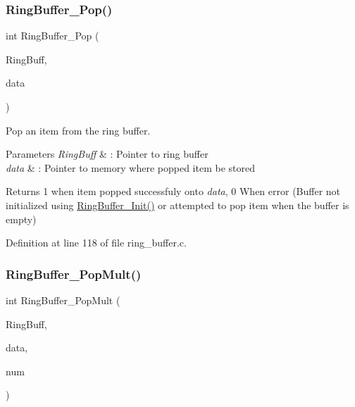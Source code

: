 \subsubsection{\texorpdfstring{Ring\+Buffer\+\_\+\+Pop()}{RingBuffer\_Pop()}}
{\footnotesize\ttfamily int Ring\+Buffer\+\_\+\+Pop (\begin{DoxyParamCaption}\item[{\hyperlink{struct_r_i_n_g_b_u_f_f___t}{R\+I\+N\+G\+B\+U\+F\+F\+\_\+T} $\ast$}]{Ring\+Buff,  }\item[{void $\ast$}]{data }\end{DoxyParamCaption})}



Pop an item from the ring buffer. 


\begin{DoxyParams}{Parameters}
{\em Ring\+Buff} & \+: Pointer to ring buffer \\
\hline
{\em data} & \+: Pointer to memory where popped item be stored \\
\hline
\end{DoxyParams}
\begin{DoxyReturn}{Returns}
1 when item popped successfuly onto {\itshape data}, 0 When error (Buffer not initialized using \hyperlink{group___ring___buffer_gaaf3bb51f2228ea1bea603e19c7eba5bb}{Ring\+Buffer\+\_\+\+Init()} or attempted to pop item when the buffer is empty) 
\end{DoxyReturn}


Definition at line 118 of file ring\+\_\+buffer.\+c.

\mbox{\label{group___ring___buffer_gae0ef7bb96d1fe84ae1441b7c214b1e56}} 
\subsubsection{\texorpdfstring{Ring\+Buffer\+\_\+\+Pop\+Mult()}{RingBuffer\_PopMult()}}
{\footnotesize\ttfamily int Ring\+Buffer\+\_\+\+Pop\+Mult (\begin{DoxyParamCaption}\item[{\hyperlink{struct_r_i_n_g_b_u_f_f___t}{R\+I\+N\+G\+B\+U\+F\+F\+\_\+T} $\ast$}]{Ring\+Buff,  }\item[{void $\ast$}]{data,  }\item[{int}]{num }\end{DoxyParamCaption})}



